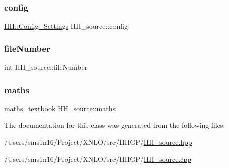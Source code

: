 \subsubsection{\texorpdfstring{config}{config}}
{\footnotesize\ttfamily \mbox{\hyperlink{class_h_h_1_1_config___settings}{H\+H\+::\+Config\+\_\+\+Settings}} H\+H\+\_\+source\+::config\hspace{0.3cm}{\ttfamily [private]}}

\mbox{\label{class_h_h__source_a6631481cc1bea05ab564cb1841644a12}} 
\subsubsection{\texorpdfstring{fileNumber}{fileNumber}}
{\footnotesize\ttfamily int H\+H\+\_\+source\+::file\+Number\hspace{0.3cm}{\ttfamily [private]}}

\mbox{\label{class_h_h__source_a93637ad30af846dd04eb741437114f8f}} 
\subsubsection{\texorpdfstring{maths}{maths}}
{\footnotesize\ttfamily \mbox{\hyperlink{classmaths__textbook}{maths\+\_\+textbook}} H\+H\+\_\+source\+::maths\hspace{0.3cm}{\ttfamily [private]}}



The documentation for this class was generated from the following files\+:\begin{DoxyCompactItemize}
\item 
/\+Users/sms1n16/\+Project/\+X\+N\+L\+O/src/\+H\+H\+G\+P/\mbox{\hyperlink{_h_h__source_8hpp}{H\+H\+\_\+source.\+hpp}}\item 
/\+Users/sms1n16/\+Project/\+X\+N\+L\+O/src/\+H\+H\+G\+P/\mbox{\hyperlink{_h_h__source_8cpp}{H\+H\+\_\+source.\+cpp}}\end{DoxyCompactItemize}
